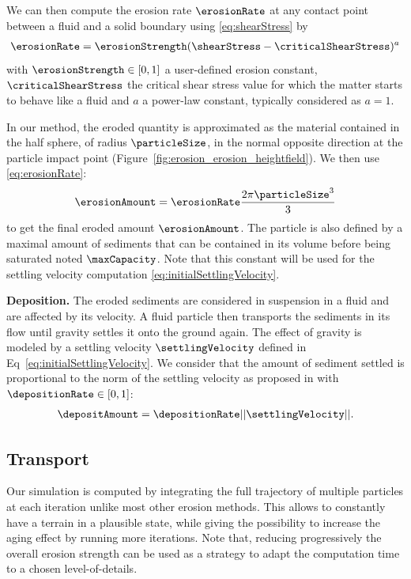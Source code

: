 We can then compute the erosion rate $\erosionRate$ at any contact point between a fluid and a solid boundary using \eqref{eq:shearStress} by 
\begin{align}\label{eq:erosionRate}
\erosionRate = \erosionStrength (\shearStress - \criticalShearStress)^a
\end{align}
with $\erosionStrength \in [0,1]$ a user-defined erosion constant, $\criticalShearStress$ the critical shear stress value for which the matter starts to behave like a fluid and $a$ a power-law constant, typically considered as $a = 1$. 

In our method, the eroded quantity is approximated as the material contained in the half sphere, of radius $\particleSize$, in the normal opposite direction at the particle impact point (Figure~\ref{fig:erosion_erosion_heightfield}). We then use \eqref{eq:erosionRate}: 
\begin{align}\label{eq:erosionAmount} 
\erosionAmount = \erosionRate \frac{ 2 \pi \particleSize^3 }{ 3 }
\end{align}
to get the final eroded amount $\erosionAmount$. The particle is also defined by a maximal amount of sediments that can be contained in its volume before being saturated noted $\maxCapacity$. Note that this constant will be used for the settling velocity computation \eqref{eq:initialSettlingVelocity}.

\textbf{Deposition.}
The eroded sediments are considered in suspension in a fluid and are affected by its velocity. A fluid particle then transports the sediments in its flow until gravity settles it onto the ground again. The effect of gravity is modeled by a settling velocity $\settlingVelocity$ defined in Eq~\eqref{eq:initialSettlingVelocity}. We consider that the amount of sediment settled is proportional to the norm of the settling velocity as proposed in \cite{Wojtan2007} with $\depositionRate \in [0,1]$: 
\begin{align}\label{eq:deltaDepositon}
\depositAmount = \depositionRate ||\settlingVelocity||.
\end{align}


\subsection{Transport}
Our simulation is computed by integrating the full trajectory of multiple particles at each iteration unlike most other erosion methods. This allows to constantly have a terrain in a plausible state, while giving the possibility to increase the aging effect by running more iterations. 
Note that, reducing progressively the overall erosion strength can be used as a strategy to adapt the computation time to a chosen level-of-details.

